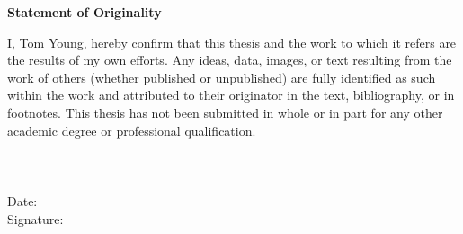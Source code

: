 \documentclass[main.tex]{subfiles}
\begin{document}
	\newpage
	
	

	\begin{center}
		{\bfseries\Large \textsf{Statement of Originality}}
	\end{center}
	I, Tom Young, hereby confirm that this thesis and the work to which it refers are the results of my own efforts. Any ideas, data, images, or text resulting from the work of others (whether published or unpublished) are fully identified as such within the work and attributed to their originator in the text, bibliography, or in footnotes. This thesis has not been submitted in whole or in part for any other academic degree or professional qualification.\\
	\ \\
	\ \\
	\ \\
	\vspace{1.5cm}
	Date:\\
	\vspace{1.5cm}
	Signature:
	
	
	\newpage
	
	


\end{document}
